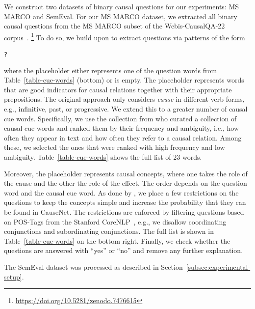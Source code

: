 We construct two datasets of binary causal questions for our experiments: MS MARCO and SemEval. For our MS MARCO dataset, we extracted all binary causal questions from the MS MARCO subset of the Webis-CausalQA-22 corpus~\cite{Bondarenko2022CausalQA}.%
\footnote{\url{https://doi.org/10.5281/zenodo.7476615}}
To do so, we build upon
\citet{Heindorf2020Causenet} to extract questions via patterns of the form
\begin{center}
\small
\texttt{?\xspace}
\texttt{\xspace}
\texttt{\xspace}
\texttt{\xspace}
\end{center}
where the \texttt{\xspace} placeholder either represents one of the question words from Table~\ref{table-cue-words} (bottom) or is empty. The \texttt{\xspace} placeholder represents words that are good indicators for causal relations together with their appropriate prepositions. The original approach only considers \textit{cause} in different verb forms, e.g., infinitive, past, or progressive. We extend this to a greater number of causal cue words. Specifically, we use the collection from \citet{Girju2002CausalCue} who curated a collection of causal cue words and ranked them by their frequency and ambiguity, i.e., how often they appear in text and how often they refer to a causal relation. Among these, we selected the ones that were ranked with high frequency and low ambiguity. Table~\ref{table-cue-words} shows the full list of 23 words.

Moreover, the \texttt{\xspace} placeholder represents causal concepts, where one takes the role of the cause and the other the role of the effect. The order depends on the question word and the causal cue word. As done by \citet{Heindorf2020Causenet}, we place a few restrictions on the questions to keep the concepts simple and increase the probability that they can be found in CauseNet. The restrictions are enforced by filtering questions based on POS-Tags from the Stanford CoreNLP~\cite{Manning2014NLP}, e.g., we disallow coordinating conjunctions and subordinating conjunctions. The full list is shown in Table~\ref{table-cue-words} on the bottom right. Finally, we check whether the questions are answered with ``yes'' or ``no'' and remove 
any further explanation.

The SemEval dataset was processed as described in Section~\ref{subsec:experimental-setup}.

